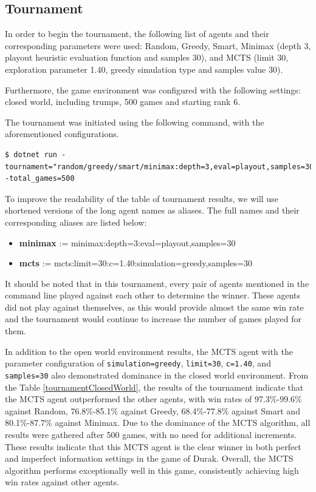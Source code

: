 \subsection{Tournament}
In order to begin the tournament, the following list of agents and their corresponding parameters were used: Random, Greedy, Smart, Minimax (depth 3, playout heuristic evaluation function and samples 30), and MCTS (limit 30, exploration parameter 1.40, greedy simulation type and samples value 30).

Furthermore, the game environment was configured with the following settings: closed world, including trumps, 500 games and starting rank 6.

The tournament was initiated using the following command, with the aforementioned configurations.

\begin{lstlisting}
$ dotnet run -tournament="random/greedy/smart/minimax:depth=3,eval=playout,samples=30/mcts:limit=30,c=1.40,simulation=greedy,samples=30" -total_games=500
\end{lstlisting}

To improve the readability of the table of tournament results, we will use shortened versions of the long agent names as aliases. The full names and their corresponding aliases are listed below:

\begin{itemize}
	\item \textbf{minimax} := minimax:depth=3:eval=playout,samples=30
	\item \textbf{mcts} := mcts:limit=30:c=1.40:simulation=greedy,samples=30
\end{itemize}


It should be noted that in this tournament, every pair of agents mentioned in the command line played against each other to determine the winner. These agents did not play against themselves, as this would provide almost the same win rate and the tournament would continue to increase the number of games played for them.

In addition to the open world environment results, the MCTS agent with the parameter configuration of \texttt{simulation=greedy}, \texttt{limit=30}, \texttt{c=1.40}, and \texttt{samples=30} also demonstrated dominance in the closed world environment. From the Table \ref{tournamentClosedWorld}, the results of the tournament indicate that the MCTS agent outperformed the other agents, with win rates of 97.3\%-99.6\% against Random, 76.8\%-85.1\% against Greedy, 68.4\%-77.8\% against Smart and 80.1\%-87.7\% against Minimax. Due to the dominance of the MCTS algorithm, all results were gathered after 500 games, with no need for additional increments. These results indicate that this MCTS agent is the clear winner in both perfect and imperfect information settings in the game of Durak. Overall, the MCTS algorithm performs exceptionally well in this game, consistently achieving high win rates against other agents.

